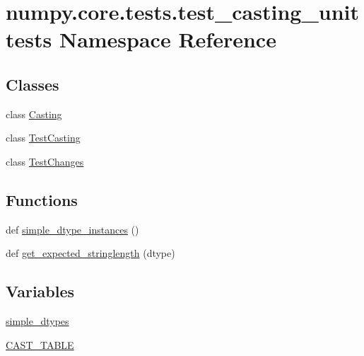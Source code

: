 \hypertarget{namespacenumpy_1_1core_1_1tests_1_1test__casting__unittests}{}\section{numpy.\+core.\+tests.\+test\+\_\+casting\+\_\+unittests Namespace Reference}
\label{namespacenumpy_1_1core_1_1tests_1_1test__casting__unittests}
\subsection*{Classes}
\begin{DoxyCompactItemize}
\item 
class \hyperlink{classnumpy_1_1core_1_1tests_1_1test__casting__unittests_1_1Casting}{Casting}
\item 
class \hyperlink{classnumpy_1_1core_1_1tests_1_1test__casting__unittests_1_1TestCasting}{Test\+Casting}
\item 
class \hyperlink{classnumpy_1_1core_1_1tests_1_1test__casting__unittests_1_1TestChanges}{Test\+Changes}
\end{DoxyCompactItemize}
\subsection*{Functions}
\begin{DoxyCompactItemize}
\item 
def \hyperlink{namespacenumpy_1_1core_1_1tests_1_1test__casting__unittests_ae90f8b29e9b1ca679e0092bbde3a388f}{simple\+\_\+dtype\+\_\+instances} ()
\item 
def \hyperlink{namespacenumpy_1_1core_1_1tests_1_1test__casting__unittests_a66d35f474001c161e400bed6f84f8633}{get\+\_\+expected\+\_\+stringlength} (dtype)
\end{DoxyCompactItemize}
\subsection*{Variables}
\begin{DoxyCompactItemize}
\item 
\hyperlink{namespacenumpy_1_1core_1_1tests_1_1test__casting__unittests_a13812f2bf97624ad70443a03bc6f5157}{simple\+\_\+dtypes}
\item 
\hyperlink{namespacenumpy_1_1core_1_1tests_1_1test__casting__unittests_af99180a8f749925a60d8f15f6ee879e3}{C\+A\+S\+T\+\_\+\+T\+A\+B\+LE}
\end{DoxyCompactItemize}


